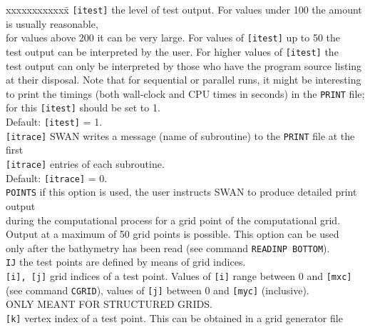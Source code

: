 \documentclass[12pt]{book}
\begin{document}
\begin{tabbing}
 xxxxxxxxxxxx\= \kill
{\tt [itest]}  \> the level of test output. For values under 100 the amount is usually reasonable,\+\\
                  for values above 200 it can be very large. For values of {\tt [itest]} up to 50 the\\
                  test output can be interpreted by the user. For higher values of {\tt [itest]} the\\
                  test output can only be interpreted by those who have the program source listing\\
                  at their disposal. Note that for sequential or parallel runs, it might be interesting\\
                  to print the timings (both wall-clock and CPU times in seconds) in the {\tt PRINT} file;\\
                  for this {\tt [itest]} should be set to 1.\\
                  Default: {\tt [itest]} = 1.\-\\
{\tt [itrace]} \> SWAN writes a message (name of subroutine) to the {\tt PRINT} file at the first\+\\
                  {\tt [itrace]} entries of each subroutine.\\
                  Default: {\tt [itrace]} = 0.\-\\
{\tt POINTS}   \> if this option is used, the user instructs SWAN to produce detailed print output\+\\
                  during the computational process for a grid point of the computational grid.\\
                  Output at a maximum of 50 grid points is possible. This option can be used\\
                  only after the bathymetry has been read (see command {\tt READINP BOTTOM}).\-\\
{\tt IJ}       \> the test points are defined by means of grid indices.\\
{\tt [i], [j]} \> grid indices of a test point. Values of {\tt [i]} range between 0 and {\tt [mxc]}\+\\
                  (see command {\tt CGRID}), values of {\tt [j]} between 0 and {\tt [myc]} (inclusive).\\
                  ONLY MEANT FOR STRUCTURED GRIDS.\-\\
{\tt [k]}      \> vertex index of a test point. This can be obtained in a grid generator file\+\\

\end{tabbing}
\end{document}
